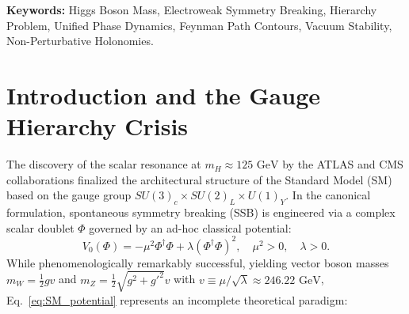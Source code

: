 \documentclass[11pt,a4paper]{article}
\begin{document}
\noindent\textbf{Keywords:} Higgs Boson Mass, Electroweak Symmetry Breaking, Hierarchy Problem, Unified Phase Dynamics, Feynman Path Contours, Vacuum Stability, Non-Perturbative Holonomies.

\section{Introduction and the Gauge Hierarchy Crisis}
The discovery of the scalar resonance at $m_H \approx 125\text{ GeV}$ by the ATLAS and CMS collaborations \cite{Aad2012, Chatrchyan2012} finalized the architectural structure of the Standard Model (SM) based on the gauge group $SU(3)_c \times SU(2)_L \times U(1)_Y$. In the canonical formulation, spontaneous symmetry breaking (SSB) is engineered via a complex scalar doublet $\Phi$ governed by an ad-hoc classical potential:
\begin{equation}
V_0(\Phi) = -\mu^2 \Phi^\dagger \Phi + \lambda (\Phi^\dagger \Phi)^2, \quad \mu^2 > 0, \quad \lambda > 0.
\label{eq:SM_potential}
\end{equation}
While phenomenologically remarkably successful, yielding vector boson masses $m_W = \frac{1}{2}gv$ and $m_Z = \frac{1}{2}\sqrt{g^2+g'^2}v$ with $v \equiv \mu / \sqrt{\lambda} \approx 246.22\text{ GeV}$, Eq.~\eqref{eq:SM_potential} represents an incomplete theoretical paradigm:
\end{document}
